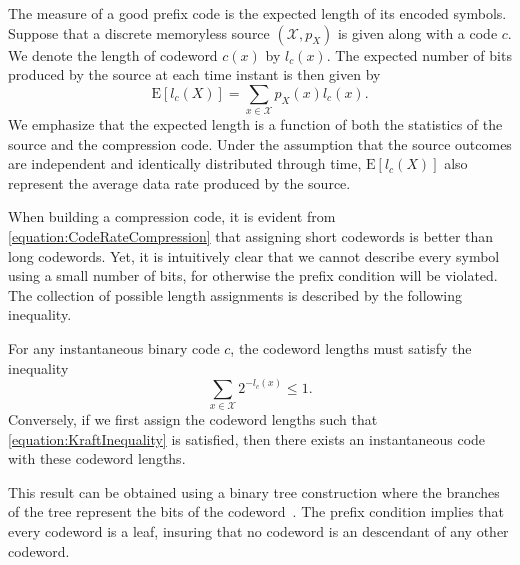 The measure of a good prefix code is the expected length of its encoded symbols.
Suppose that a discrete memoryless source $(\mathcal{X}, p_X)$ is given along with a code $c$.
We denote the length of codeword $c(x)$ by $l_c(x)$.
The expected number of bits produced by the source at each time instant is then given by
\begin{equation} \label{equation:CodeRateCompression}
\mathrm{E} [ l_c (X) ] = \sum_{x \in \mathcal{X}} p_X(x) l_c(x) .
\end{equation}
We emphasize that the expected length is a function of both the statistics of the source and the compression code.
Under the assumption that the source outcomes are independent and identically distributed through time, $\mathrm{E} [ l_c (X)]$ also represent the average data rate produced by the source.

When building a compression code, it is evident from \eqref{equation:CodeRateCompression} that assigning short codewords is better than long codewords.
Yet, it is intuitively clear that we cannot describe every symbol using a small number of bits, for otherwise the prefix condition will be violated.
The collection of possible length assignments is described by the following inequality.

\begin{theorem}
For any instantaneous binary code $c$, the codeword lengths must satisfy the inequality
\begin{equation} \label{equation:KraftInequality}
\sum_{x \in \mathcal{X}} 2^{-l_c(x)} \leq 1.
\end{equation}
Conversely, if we first assign the codeword lengths such that \eqref{equation:KraftInequality} is satisfied, then there exists an instantaneous code with these codeword lengths.
\end{theorem}

This result can be obtained using a binary tree construction where the branches of the tree represent the bits of the codeword~\cite{CoverThomas}.
The prefix condition implies that every codeword is a leaf, insuring that no codeword is an descendant of any other codeword.

